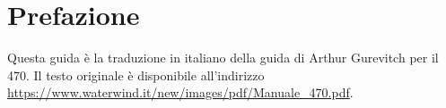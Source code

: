 \section{Prefazione}
\label{sec:Prefazione}
Questa guida è la traduzione in italiano della guida di Arthur Gurevitch per il
470. Il testo originale è disponibile all'indirizzo
\url{https://www.waterwind.it/new/images/pdf/Manuale_470.pdf}.
